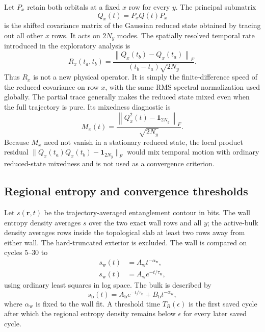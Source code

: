 \documentclass[aps,prb,twocolumn,nofootinbib,superscriptaddress,floatfix]{revtex4-2}
\newcommand{\Qcov}{Q}
\begin{document}
Let $P_x$ retain both orbitals at a fixed $x$ row for every $y$.  The principal
submatrix
\begin{equation}
 \Qcov_x(t)=P_x\Qcov(t)P_x
 \label{eq:reducedQ}
\end{equation}
is the shifted covariance matrix of the Gaussian reduced state obtained by
tracing out all other $x$ rows.  It acts on $2N_y$ modes.  The spatially
resolved temporal rate introduced in the exploratory analysis is
\begin{equation}
 R_x(t_a,t_b)=
 \frac{\left\lVert\Qcov_x(t_b)-\Qcov_x(t_a)\right\rVert_F}
 {(t_b-t_a)\sqrt{2N_y}}.
 \label{eq:Rx}
\end{equation}
Thus $R_x$ is not a new physical operator.  It is simply the finite-difference
speed of the reduced covariance on row $x$, with the same RMS spectral
normalization used globally.  The partial trace generally makes the reduced
state mixed even when the full trajectory is pure.  Its mixedness diagnostic is
\begin{equation}
 M_x(t)=\frac{\left\lVert\Qcov_x^2(t)-\mathbf{1}_{2N_y}\right\rVert_F}
 {\sqrt{2N_y}}.
 \label{eq:Mx}
\end{equation}
Because $M_x$ need not vanish in a stationary reduced state, the local product
residual
$\lVert\Qcov_x(t_a)\Qcov_x(t_b)-\mathbf{1}_{2N_y}\rVert_F$ would mix temporal
motion with ordinary reduced-state mixedness and is not used as a convergence
criterion.

\subsection{Regional entropy and convergence thresholds}

Let $s(\boldsymbol r,t)$ be the trajectory-averaged entanglement contour in
bits.  The wall entropy density averages $s$ over the two exact wall rows and
all $y$; the active-bulk density averages rows inside the topological slab at
least two rows away from either wall.  The hard-truncated exterior is excluded.
The wall is compared on cycles $5$--$30$ to
\begin{align}
 s_{\mathrm w}(t)&=A_{\mathrm w}t^{-\alpha_{\mathrm w}},
 \label{eq:wallpower}\\
 s_{\mathrm w}(t)&=A_{\mathrm w}e^{-t/\tau_{\mathrm w}},
 \label{eq:wallexponential}
\end{align}
using ordinary least squares in log space.  The bulk is described by
\begin{equation}
 s_{\mathrm b}(t)=A_{\mathrm b}e^{-t/\tau_{\mathrm b}}
 +B_{\mathrm b}t^{-\alpha_{\mathrm w}},
 \label{eq:bulkmodel}
\end{equation}
where $\alpha_{\mathrm w}$ is fixed to the wall fit.  A threshold time
$T_R(\epsilon)$ is the first saved cycle after which the regional entropy
density remains below $\epsilon$ for every later saved cycle.
\end{document}
